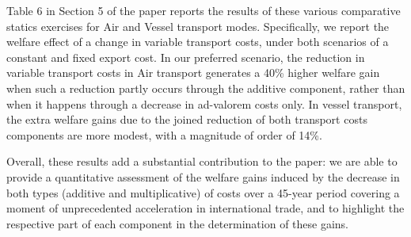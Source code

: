 \documentclass[a4paper,11pt]{article}
\begin{document}
Table 6 in Section 5 of the paper reports the results of these various comparative statics exercises for Air and Vessel transport modes. Specifically, we report the welfare effect of a change in variable transport costs, under both scenarios of a constant and fixed export cost. In our preferred scenario, the reduction in variable transport costs in Air transport generates a 40\% higher welfare gain when such a reduction partly
occurs through the additive component, rather than when it happens through a decrease in ad-valorem costs only. In vessel transport, the
extra welfare gains due to the joined reduction of both transport costs components are more modest, with a magnitude of order of 14\%.

Overall, these results add a substantial contribution to the paper: we are able to provide a quantitative assessment of the welfare gains induced by the decrease in both types (additive and multiplicative) of costs over a 45-year period covering a moment of unprecedented acceleration in international trade, and to highlight the respective part of each component in the determination of these gains.







\end{document}
